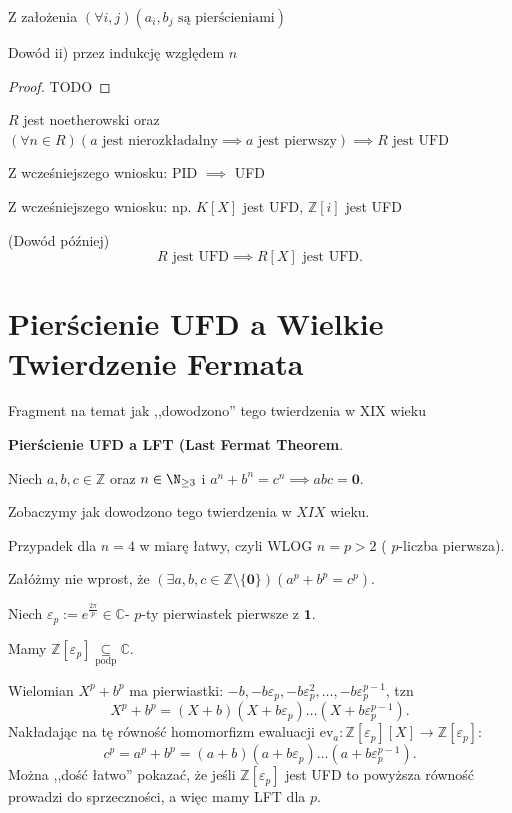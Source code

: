 Z założenia $\left(\forall i,j \right) \left( a_{i},b_{j}\text{ są pierścieniami} \right) $ 

Dowód ii) przez indukcję względem $n$
 \begin{proof}
	TODO
\end{proof} 

\begin{corollary}
	$R$ jest noetherowski oraz $\left(\forall n \in R \right)\left( a \text{ jest nierozkładalny} \implies a \text{ jest pierwszy}\right)  \implies R \text{ jest UFD}$
\end{corollary}
\begin{corollary}
Z wcześniejszego wniosku: PID  $\implies$ UFD
\end{corollary}
\begin{corollary}
	Z wcześniejszego wniosku: np. $K\left[ X \right] $ jest UFD, $\mathbb{Z} \left[ i \right] $ jest UFD
\end{corollary}
\begin{theorem}[Gaussa]
	(Dowód później)
	\[
	R \text{ jest UFD} \implies R\left[ X \right] \text{ jest UFD} 
	.\] 
\end{theorem} 
\section{Pierścienie UFD a Wielkie Twierdzenie Fermata}
Fragment na temat jak ,,dowodzono'' tego twierdzenia w XIX wieku

\textbf{Pierścienie UFD a LFT (Last Fermat Theorem}.

Niech $a,b,c \in \mathbb{Z} $ oraz $n \in \N_{\ge 3}$ i $a^{n}+b^{n}=c^{n} \implies abc = \mathbf{0}$.

Zobaczymy jak dowodzono tego twierdzenia w $XIX$ wieku.

Przypadek dla $n = 4$ w miarę łatwy, czyli WLOG $n = p >2 $ ( $p$-liczba pierwsza).

Załóżmy nie wprost, że $\left(\exists a,b,c \in \mathbb{Z} \setminus \{\mathbf{0}\}  \right)\left( a^{p}+b^{p}=c^{p} \right)  $.

Niech $\varepsilon _{p}:= e^{\frac{2\pi}{p}} \in \mathbb{C} $- $p$-ty pierwiastek pierwsze z $\mathbf{1}$.

Mamy $\mathbb{Z} \left[ \varepsilon_{p} \right] \underset{\scriptscriptstyle\text{podp}}{\subseteq} \mathbb{C} $. 

Wielomian $X^{p}+ b^{p}$ ma pierwiastki: $-b, -b\varepsilon _{p},-b\varepsilon^{2}_{p},\ldots, -b\varepsilon^{p-1}_{p}$, tzn
\[
X^{p}+ b^{p}= \left( X+b \right)\left( X+b\varepsilon_{p} \right)\ldots\left( X + b\varepsilon^{p-1}_{p} \right) 
.\] 
Nakładając na tę równość homomorfizm ewaluacji $\text{ev}_{a}: \mathbb{Z} \left[ \varepsilon_{p} \right]\left[ X \right] \to \mathbb{Z} \left[ \varepsilon_{p} \right] :$
\[
c^{p} = a^{p} + b^{p} = \left( a + b \right) \left( a + b\varepsilon_{p} \right)\ldots\left( a+b\varepsilon_{p}^{p-1} \right) 
.\] 
Można ,,dość łatwo'' pokazać, że jeśli $\mathbb{Z} \left[ \varepsilon _{p} \right] $ jest UFD to powyższa równość prowadzi do sprzeczności, a więc mamy LFT dla $p$.


